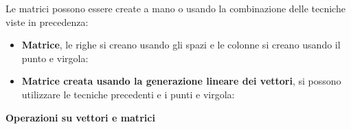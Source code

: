 Le matrici possono essere create a mano o usando la combinazione delle tecniche viste in precedenza:
\begin{itemize}
    \item \textbf{Matrice}, le righe si creano usando gli spazi e le colonne si creano usando il punto e virgola:
    

    \item \textbf{Matrice creata usando la generazione lineare dei vettori}, si possono utilizzare le tecniche precedenti e i punti e virgola:
    
\end{itemize}

\newpage

\begin{flushleft}
    \large
    \hypertarget{
        lab: Operazioni su vettori e matrici
    }{
        \textcolor{Red3}{\textbf{Operazioni su vettori e matrici}}
    }
    \label{lab: Operazioni su vettori e matrici}
\end{flushleft}
